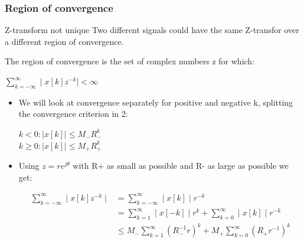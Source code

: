 \begin{frame}
	\frametitle{Region of convergence}
	\begin{alertblock}{Z-transform not unique}
		Two different signals could have the same Z-transfor over a different region of convergence.
	\end{alertblock}
	\begin{definition}
		The region of convergence is the set of complex numbers z for which:
		\vspace{-2em}
		\begin{center}
			$\sum\limits_{k=-\infty}^{\infty} \mid x[k]z^{-k} \mid < \infty$
		\end{center}
		
	\end{definition}
	
	
\end{frame}
\begin{frame}
		\begin{itemize}
			\item We will look at convergence separately for positive and negative k, splitting the convergence criterion in 2:
			\begin{center}
				$k<0: \mid x[k] \mid \leq M_{-}R_{-}^{k}$\\
				$k\geq 0: \mid x[k] \mid \leq M_{+}R_{+}^{k} $
			\end{center}
			\item Using $z = r e^{j\theta}$ with R+ as small as possible and R- as large as possible we get:
			\vspace{-2em}
			\begin{center}
				\begin{align*}
				\sum\limits_{k=-\infty}^{\infty} \mid x[k]z^{-k} \mid &= \sum\limits_{k=-\infty}^{\infty} \mid x[k] \mid r^{-k} \\
				&= \sum\limits_{k=1}^{\infty} \mid x[-k] \mid r^{k} + \sum\limits_{k=0}^{\infty} \mid x[k] \mid r^{-k} \\
				&\leq M_{-} \sum\limits_{k=1}^{\infty} (R_{-}^{-1}r)^{k} + M_{+} \sum\limits_{k= 0}^{\infty}(R_{+}r^{-1})^{k}
				\end{align*}
			\end{center}
		\end{itemize}
\end{frame}
